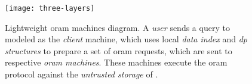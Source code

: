 \begin{figure}[ht!]
	\centering
	\texttt{[image: three-layers]}
	\caption[Lightweight \acrshort{oram} machines diagram]{
		Lightweight \acrshort{oram} machines diagram.
		A \emph{user} sends a query to \user{} modeled as the \emph{client} machine, which uses local \emph{data index} and \emph{\acrshort{dp} structures} to prepare a set of \acrshort{oram} requests, which are sent to respective \emph{\acrshort{oram} machines}.
		These machines execute the \acrshort{oram} protocol against the \emph{untrusted storage} of \server{}.
	}%
	\label{figure:three-tier}
\end{figure}

